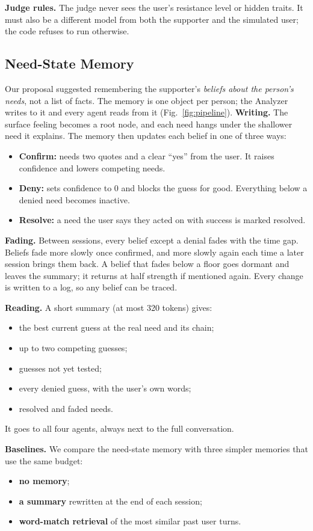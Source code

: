 \documentclass[journal]{IEEEtran}
\begin{document}
\textbf{Judge rules.} The judge never sees the user's resistance level or hidden traits. It must also be a different model from both the supporter and the simulated user; the code refuses to run otherwise.

\subsection{Need-State Memory}\label{sec:memory}
Our proposal suggested remembering the supporter's \emph{beliefs about the person's needs}, not a list of facts. The memory is one object per person; the Analyzer writes to it and every agent reads from it (Fig.~\ref{fig:pipeline}).
\textbf{Writing.} The surface feeling becomes a root node, and each need hangs under the shallower need it explains. The memory then updates each belief in one of three ways:
\begin{itemize}
\item \textbf{Confirm:} needs two quotes and a clear ``yes'' from the user. It raises confidence and lowers competing needs.
\item \textbf{Deny:} sets confidence to 0 and blocks the guess for good. Everything below a denied need becomes inactive.
\item \textbf{Resolve:} a need the user says they acted on with success is marked resolved.
\end{itemize}

\textbf{Fading.} Between sessions, every belief except a denial fades with the time gap. Beliefs fade more slowly once confirmed, and more slowly again each time a later session brings them back. A belief that fades below a floor goes dormant and leaves the summary; it returns at half strength if mentioned again. Every change is written to a log, so any belief can be traced.

\textbf{Reading.} A short summary (at most 320 tokens) gives:
\begin{itemize}
\item the best current guess at the real need and its chain;
\item up to two competing guesses;
\item guesses not yet tested;
\item every denied guess, with the user's own words;
\item resolved and faded needs.
\end{itemize}
It goes to all four agents, always next to the full conversation.

\textbf{Baselines.} We compare the need-state memory with three simpler memories that use the same budget:
\begin{itemize}
\item \textbf{no memory};
\item \textbf{a summary} rewritten at the end of each session;
\item \textbf{word-match retrieval} of the most similar past user turns.
\end{itemize}
\end{document}
